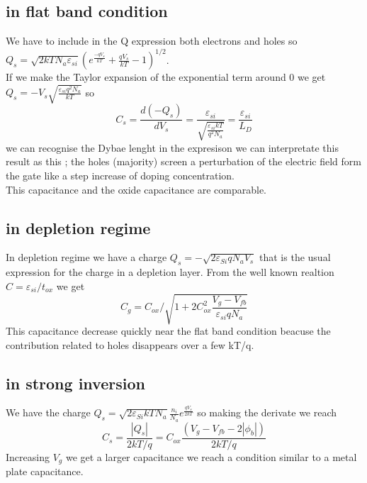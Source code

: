 \subsection{in flat band condition}
We have to include in the Q expression both electrons and holes so $Q_s=\sqrt{2kTN_a\varepsilon_{si}}(e^{\frac{-qV_s}{kT}}+\frac{qV_s}{kT}-1)^{1/2}$.\\ If we make the Taylor expansion of the exponential term around 0 we get $Q_s=-V_s\sqrt{\frac{\varepsilon_{si}q^2N_a}{kT}}$ so 
\begin{equation}
C_s=\frac{d(-Q_s)}{dV_s}=\frac{\varepsilon_{si}}{\sqrt{\frac{\varepsilon_{si}kT}{q^2 N_a}}}=\frac{\varepsilon_{si}}{L_D}
\end{equation}
we can recognise the Dybae lenght in the expresison we can interpretate this result as this ; the holes (majority) screen a perturbation of the electric field form the gate like a step increase of doping concentration.\\
This capacitance and the oxide capacitance are comparable.\\

\subsection{in depletion regime}
In depletion regime we have a charge $Q_s=-\sqrt{2\varepsilon_{Si} q N_a V_s}$ that is the usual expression for the charge in a depletion layer. From the well known realtion $C=\varepsilon_{si}/t_{ox}$ we get 
\begin{equation}
C_g=C_{ox}/\sqrt{1+2C_{ox}^2 \frac{V_g-V_{fb}}{\varepsilon_{si}qN_a}}
\end{equation}
This capacitance decrease quickly near the flat band condition beacuse the contribution related to holes disappears over a few kT/q.\\

\subsection{in strong inversion} 
We have the charge $Q_s=\sqrt{2\varepsilon_{Si}kTN_a}\frac{n_i}{N_a}e^{\frac{qV_s}{2kT}}$ so making the derivate we reach 
\begin{equation}
C_s=\frac{|Q_s|}{2kT/q}=C_{ox}\frac{(V_g-V_{fb}-2|\phi_b|)}{2kT/q}
\end{equation}
Increasing $V_g$ we get a larger capacitance we reach a condition similar to a metal plate capacitance.\\

